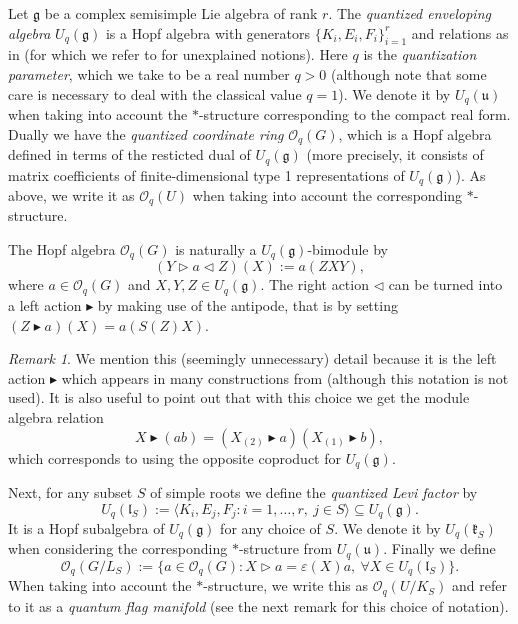\documentclass[a4paper,12pt,reqno,english]{amsart}
\numberwithin{equation}{section}
\numberwithin{figure}{section}
\theoremstyle{plain}
\theoremstyle{plain}
\theoremstyle{plain}
\theoremstyle{plain}
\theoremstyle{plain}
\theoremstyle{definition}
\theoremstyle{definition}
\theoremstyle{definition}
\theoremstyle{remark}
\newtheorem{remark}[theorem]{Remark}
\theoremstyle{definition}
\newcommand{\lieg}{\mathfrak{g}}
\newcommand{\Uqg}{U_q(\mathfrak{g})}
\newcommand{\Uqu}{U_q(\mathfrak{u})}
\newcommand{\UqlS}{U_q(\mathfrak{l}_S)}
\newcommand{\UqkS}{U_q(\mathfrak{k}_S)}
\newcommand{\OqG}{\mathcal{O}_q(G)}
\newcommand{\OqU}{\mathcal{O}_q(U)}
\newcommand{\OqLevi}{\mathcal{O}_q(G / L_S)}
\newcommand{\Oqflag}{\mathcal{O}_q(U / K_S)}
\begin{document}
Let $\lieg$ be a complex semisimple Lie algebra of rank $r$.
The \emph{quantized enveloping algebra} $\Uqg$ is a Hopf algebra with generators $\{ K_i, E_i, F_i \}_{i = 1}^r$ and relations as in \cite{klsc} (for which we refer to for unexplained notions).
Here $q$ is the \emph{quantization parameter}, which we take to be a real number $q > 0$ (although note that some care is necessary to deal with the classical value $q = 1$).
We denote it by $\Uqu$ when taking into account the $*$-structure corresponding to the compact real form.
Dually we have the \emph{quantized coordinate ring} $\OqG$, which is a Hopf algebra defined in terms of the resticted dual of $\Uqg$ (more precisely, it consists of matrix coefficients of finite-dimensional type 1 representations of $\Uqg$).
As above, we write it as $\OqU$ when taking into account the corresponding $*$-structure.

The Hopf algebra $\OqG$ is naturally a $\Uqg$-bimodule by
\[
(Y \triangleright a \triangleleft Z)(X) := a(Z X Y),
\]
where $a \in \OqG$ and $X, Y, Z \in \Uqg$.
The right action $\triangleleft$ can be turned into a left action $\blacktriangleright$ by making use of the antipode, that is by setting $(Z \blacktriangleright a)(X) = a(S(Z) X)$.

\begin{remark}
We mention this (seemingly unnecessary) detail because it is the left action $\blacktriangleright$ which appears in many constructions from \cite{heko} (although this notation is not used).
It is also useful to point out that with this choice we get the module algebra relation
\[
X \blacktriangleright (a b) = (X_{(2)} \blacktriangleright a) (X_{(1)} \blacktriangleright b),
\]
which corresponds to using the opposite coproduct for $\Uqg$.
\end{remark}

Next, for any subset $S$ of simple roots we define the \emph{quantized Levi factor} by
\[
\UqlS := \langle K_i, E_j, F_j : i = 1, \ldots, r, \ j \in S \rangle \subseteq \Uqg.
\]
It is a Hopf subalgebra of $\Uqg$ for any choice of $S$.
We denote it by $\UqkS$ when considering the corresponding $*$-structure from $\Uqu$.
Finally we define
\[
\OqLevi := \{ a \in \OqG : X \triangleright a = \varepsilon(X) a, \ \forall X \in \UqlS \}.
\]
When taking into account the $*$-structure, we write this as $\Oqflag$ and refer to it as a \emph{quantum flag manifold} (see the next remark for this choice of notation).
\end{document}
